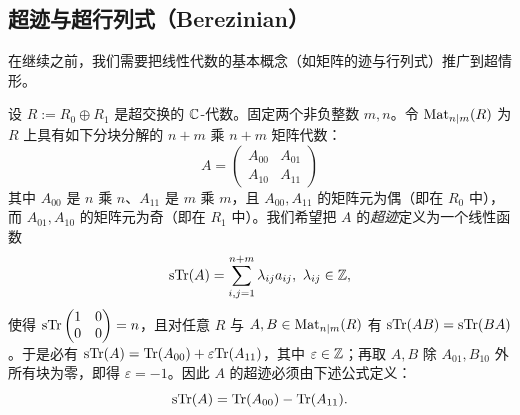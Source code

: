 \subsection{超迹与超行列式（Berezinian）}

在继续之前，我们需要把线性代数的基本概念（如矩阵的迹与行列式）推广到超情形。

设 $R:=R_0\oplus R_1$ 是超交换的 $\Bbb C$-代数。固定两个非负整数 $m,n$。令 ${\rm Mat}_{n|m}(R)$ 为 $R$ 上具有如下分块分解的 $n+m$ 乘 $n+m$ 矩阵代数：
$$
A=\begin{pmatrix} A_{00} & A_{01}\\ A_{10} & A_{11}\end{pmatrix}
$$
其中 $A_{00}$ 是 $n$ 乘 $n$、$A_{11}$ 是 $m$ 乘 $m$，且 $A_{00},A_{11}$ 的矩阵元为偶（即在 $R_0$ 中），而 $A_{01},A_{10}$ 的矩阵元为奇（即在 $R_1$ 中）。我们希望把 $A$ 的\emph{超迹}定义为一个线性函数
$$
{\rm sTr}(A)=\sum_{i,j=1}^{n+m} \lambda_{ij}a_{ij},\ \lambda_{ij}\in \Bbb Z,
$$
使得 ${\rm sTr}\begin{pmatrix} 1& 0\\ 0& 0\end{pmatrix}=n$，且对任意 $R$ 与 $A,B\in {\rm Mat}_{n|m}(R)$ 有 ${\rm sTr}(AB)={\rm sTr}(BA)$。于是必有 ${\rm sTr}(A)={\rm Tr}(A_{00})+\varepsilon {\rm Tr}(A_{11})$，其中 $\varepsilon\in \Bbb Z$；再取 $A,B$ 除 $A_{01},B_{10}$ 外所有块为零，即得 $\varepsilon =-1$。因此 $A$ 的超迹必须由下述公式定义：
$$
{\rm sTr}(A)={\rm Tr}(A_{00})-{\rm Tr}(A_{11}).
$$

